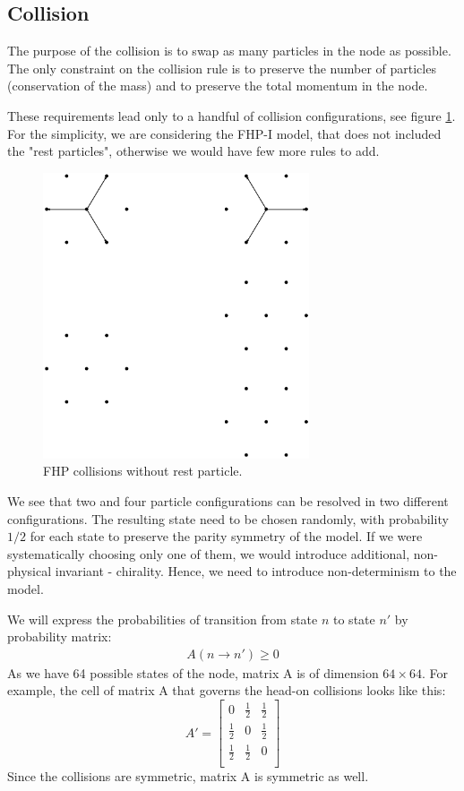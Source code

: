 \subsection{Collision}

The purpose of the collision is to swap as many particles in the node as possible.
The only constraint on the collision rule is to preserve the number of particles (conservation of the mass) and to preserve the total momentum in the node.

These requirements lead only to a handful of collision configurations, see figure \ref{FHPcol}. For the simplicity, we are considering the FHP-I model, that does not included the "rest particles", otherwise we would have few more rules to add.

\begin{figure}[H]
 \centering
 \includegraphics[width=0.7\textwidth]{./img/FHPcol}
 \caption{FHP collisions without rest particle.}
 \label{FHPcol}
\end{figure}

We see that two and four particle configurations can be resolved in two different configurations. The resulting state need to be chosen randomly, with probability $1/2$ for each state to preserve the parity symmetry of the model. If we were systematically choosing only one of them, we would introduce additional, non-physical invariant - chirality. Hence, we need to introduce non-determinism to the model.


We will express the probabilities of transition from state $n$ to state $n'$ by probability matrix:
\begin{align*}
A(n \rightarrow n') \geq 0
\end{align*}
As we have 64 possible states of the node, matrix A is of dimension $64\times 64$.
For example, the cell of matrix A that governs the head-on collisions looks like this:
\[
 A'=
  \begin{bmatrix}
    0 & \frac{1}{2} & \frac{1}{2} \\
    \frac{1}{2} & 0 & \frac{1}{2} \\
    \frac{1}{2} & \frac{1}{2} & 0 \\
  \end{bmatrix}
\]
Since the collisions are symmetric, matrix A is symmetric as well.

